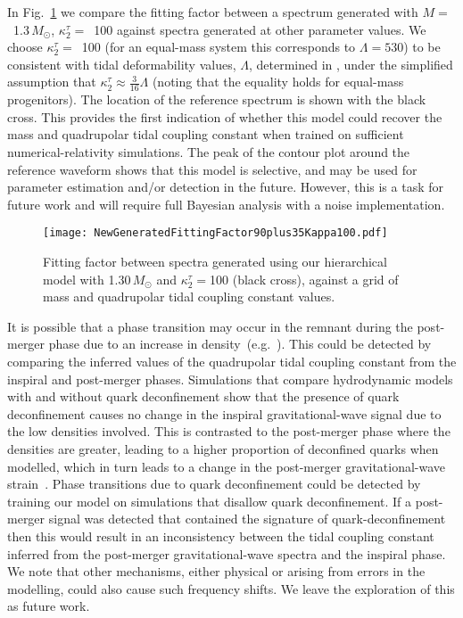 \documentclass[../Thesis.tex]{subfiles}
\begin{document}
        In Fig.~\ref{fig:GeneratedFittingFactor} we compare the fitting factor between a spectrum generated with $M=$~1.3\,$M_\odot$, $\kappa_2^\tau=$~100 against spectra generated at other parameter values. We choose $\kappa_2^\tau=$~100 (for an equal-mass system this corresponds to $\Lambda=530$) to be consistent with tidal deformability values, $\Lambda$, determined in \cite{GW170817Detection,Annala2018,Radice2018,Most2018,De2018,GW170817Properties}, under the simplified assumption that $\kappa_2^\tau\approx \frac{3}{16}\Lambda$ (noting that the equality holds for equal-mass progenitors). The location of the reference spectrum is shown with the black cross. This provides the first indication of whether this model could recover the mass and quadrupolar tidal coupling constant when trained on sufficient numerical-relativity simulations. The peak of the contour plot around the reference waveform shows that this model is selective, and may be used for parameter estimation and/or detection in the future. However, this is a task for future work and will require full Bayesian analysis with a noise implementation.
 \begin{figure}[H]
 \begin{center}
    \texttt{[image: NewGeneratedFittingFactor90plus35Kappa100.pdf]}
        \caption{Fitting factor between spectra generated using our hierarchical model with 1.30\,$M_{\odot}$ and $\kappa_2^\tau=$100 (black cross), against a grid of mass and quadrupolar tidal coupling constant values.}
        \label{fig:GeneratedFittingFactor}
     
 \end{center}
\end{figure} 
        It is possible that a phase transition may occur in the remnant during the post-merger phase due to an increase in density~(e.g.~\cite{Most2018,Bauswein2019}). This could be detected by comparing the inferred values of the quadrupolar tidal coupling constant from the inspiral and post-merger phases. Simulations that compare hydrodynamic models with and without quark deconfinement show that the presence of quark deconfinement causes no change in the inspiral gravitational-wave signal due to the low densities involved. This is contrasted to the post-merger phase where the densities are greater, leading to a higher proportion of deconfined quarks when modelled, which in turn leads to a change in the post-merger gravitational-wave strain~\cite{Most2018b}. Phase transitions due to quark deconfinement could be detected by training our model on simulations that disallow quark deconfinement. If a post-merger signal was detected that contained the signature of quark-deconfinement then this would result in an inconsistency between the tidal coupling constant inferred from the post-merger gravitational-wave spectra and the inspiral phase. We note that other mechanisms, either physical or arising from errors in the modelling, could also cause such frequency shifts. We leave the exploration of this as future work. \par
\end{document}

